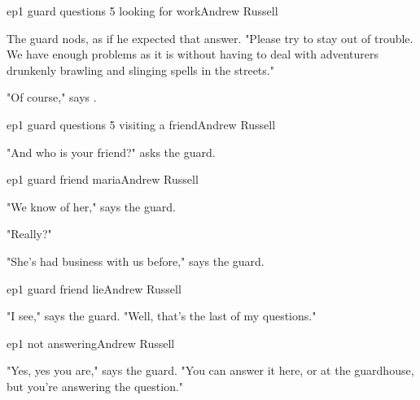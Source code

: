 \documentclass{book}
\begin{document}
\begin{childnode}{ep1 guard questions 5 looking for work}{Andrew Russell}



The guard nods, as if he expected that answer. "Please try to stay out of trouble. We have enough problems as it is without having to deal with adventurers drunkenly brawling and slinging spells in 
the streets."

"Of course," says \name{}.


\end{childnode}

\begin{childnode}{ep1 guard questions 5 visiting a friend}{Andrew Russell}

"And who is your friend?" asks the guard.




\end{childnode}

\begin{childnode}{ep1 guard friend maria}{Andrew Russell}



    "We know of her," says the guard.

    "Really?"

    "She's had business with us before," says the guard.


\end{childnode}

\begin{childnode}{ep1 guard friend lie}{Andrew Russell}

"I see," says the guard. "Well, that's the last of my questions."


\end{childnode}

\begin{childnode}{ep1 not answering}{Andrew Russell}

    "Yes, yes you are," says the guard. "You can answer it here, or at the guardhouse, but you're answering the question."




\end{childnode}
\end{document}
